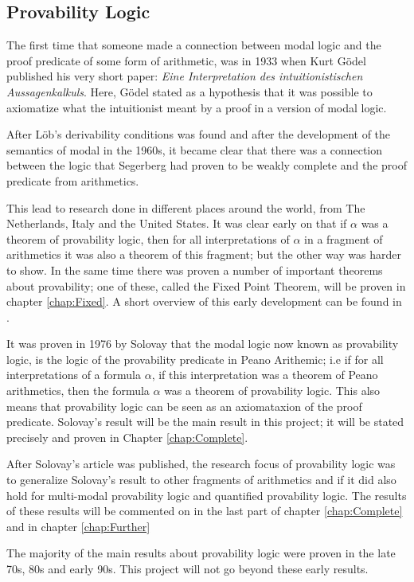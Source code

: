 \documentclass[../main.tex]{subfiles}
\begin{document}
\subsection{Provability Logic}
The first time that someone made a connection between modal logic and the proof
predicate of some form of arithmetic, was in 1933 when Kurt Gödel published his very short  paper:
\textit{Eine
Interpretation des intuitionistischen Aussagenkalkuls}. Here, Gödel
stated as a  hypothesis that it was possible to axiomatize what the
intuitionist meant by a proof in a version of modal logic.

After Löb's derivability conditions was found and after the development of the
semantics of modal in the 1960s, it became clear that there was a connection
between the logic that Segerberg had proven to be weakly complete and the proof
predicate from arithmetics.

This lead to research done in different places around the world, from The
Netherlands, Italy and the United States. It was clear early on that if
$\alpha$ was a theorem of provability logic, then for all interpretations of
$\alpha$ in a fragment of arithmetics it  was also a theorem of this fragment; but
the other way was harder to show. In the same time there was proven a number of
important theorems about provability; one of these, called the Fixed Point
Theorem,  will be proven in chapter
\ref{chap:Fixed}.
A short overview of this early
development can be found in \parencite{Bool1991}.

It was proven in 1976 by Solovay that the modal
logic now known as provability logic, is the logic of the provability predicate
in Peano Arithemic; i.e if for all interpretations
of a formula $\alpha$, if this interpretation was a theorem of Peano
arithmetics,
then the formula $\alpha$ was a theorem of provability logic. This also means that
provability logic can be seen as an axiomataxion of the proof predicate.
Solovay's result will be the main result in this project; it will be stated
precisely and proven in Chapter \ref{chap:Complete}.

After Solovay's article was published, the research focus of provability logic
was to generalize Solovay's result to other fragments of arithmetics and if
it did also hold for multi-modal provability logic and quantified provability
logic. The results of these results will be commented on in the last part of
chapter \ref{chap:Complete} and in chapter \ref{chap:Further}

The majority of the main results about provability logic were proven in the late
70s, 80s and early 90s. This project will not go beyond these early results.
\end{document}

